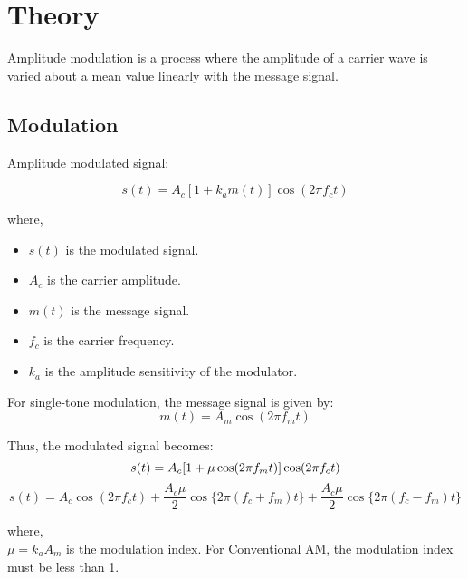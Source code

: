 \section*{Theory}

Amplitude modulation is a process where the amplitude of a carrier
wave is varied about a mean value linearly with the message signal.

\subsection*{Modulation}
Amplitude modulated signal:

\begin{equation}
    s(t) = A_c[1 + k_a m(t)]\cos(2\pi f_c t)
\end{equation}

where,\\
\begin{itemize}
    \item $s(t)$ is the modulated signal.
    \item $A_c$ is the carrier amplitude.
    \item $m(t)$ is the message signal.
    \item $f_c$ is the carrier frequency.
    \item $k_a$ is the amplitude sensitivity of the modulator.
\end{itemize}

For single-tone modulation, the message signal is given by:
\begin{equation}
    m(t) = A_m \cos(2\pi f_m t)
\end{equation}

Thus, the modulated signal becomes:
\begin{equation}
    s(t) = A_c[1 + \mu \cos(2\pi f_m t)]\cos(2\pi f_c t) \\
\end{equation}
\begin{equation}
    s(t) = A_c\cos(2\pi f_c t) + \frac{A_c\mu}{2}\cos\{2\pi (f_c + f_m) t\} + \frac{A_c\mu}{2}\cos\{2\pi (f_c - f_m) t\}
    \label{eq:single_am}
\end{equation}

where,\\
$\mu = k_a A_m$ is the modulation index.
For Conventional AM, the modulation index must be less than 1.\\

